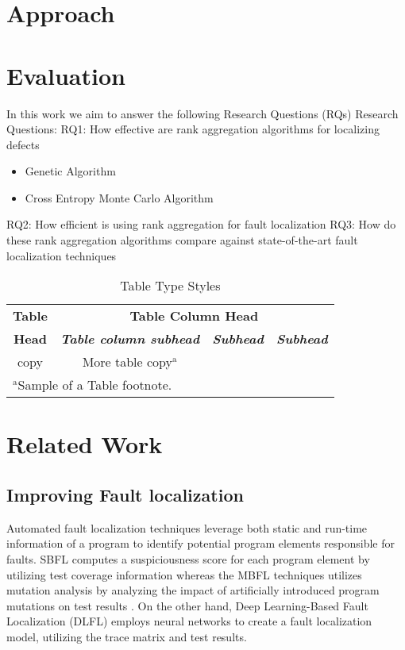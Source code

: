 \documentclass[10pt,conference]{IEEEtran}
\begin{document}
\section{Approach}
\section{Evaluation}
In this work we aim to answer the following Research Questions (RQs)
{\newline}
	Research Questions:
	RQ1: How effective are rank aggregation algorithms for localizing defects
	
	\begin{itemize}
		\item Genetic Algorithm
		\item Cross Entropy Monte Carlo Algorithm
	\end{itemize}
	RQ2: How efficient is using rank aggregation for fault localization
	{\newline}
	RQ3: How do these rank aggregation algorithms compare against state-of-the-art fault
	localization techniques
	\begin{table}[htbp]
		\caption{Table Type Styles}
		\begin{center}
			\begin{tabular}{|c|c|c|c|}
				\hline
				\textbf{Table}&\multicolumn{3}{|c|}{\textbf{Table Column Head}} \\
				\cline{2-4} 
				\textbf{Head} & \textbf{\textit{Table column subhead}}& \textbf{\textit{Subhead}}& \textbf{\textit{Subhead}} \\
				\hline
				copy& More table copy$^{\mathrm{a}}$& &  \\
				\hline
				\multicolumn{4}{l}{$^{\mathrm{a}}$Sample of a Table footnote.}
			\end{tabular}
			\label{tab1}
		\end{center}
	\end{table}
	
		\section{Related Work}
	\subsection{Improving Fault localization}
	
	Automated fault localization techniques leverage both static and run-time information of a program to identify potential program elements responsible for faults. SBFL computes a suspiciousness score for each program element by utilizing test coverage information whereas the MBFL techniques utilizes mutation analysis by analyzing the impact of artificially introduced program mutations on test results . On the other hand, Deep Learning-Based Fault Localization (DLFL) employs neural networks to create a fault localization model, utilizing the trace matrix and test results.
	
\end{document}
